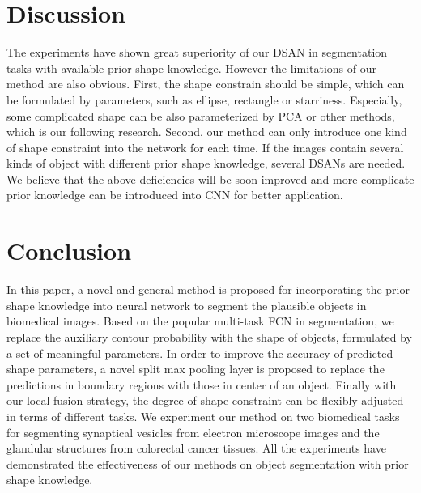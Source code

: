 \documentclass[10pt,twocolumn,letterpaper]{article}
\begin{document}





\section{Discussion}
The experiments have shown great superiority of our DSAN in segmentation tasks with available prior shape knowledge.
However the limitations of our method are also obvious.
First, the shape constrain should be simple, which can be formulated by parameters, such as ellipse, rectangle or starriness.
Especially, some complicated shape can be also parameterized by PCA or other methods, which is our following research.
Second, our method can only introduce one kind of shape constraint into the network for each time.
If the images contain several kinds of object with different prior shape knowledge, several DSANs are needed.
We believe that the above deficiencies will be soon improved and more complicate prior knowledge can be introduced into CNN for better application.

\section{Conclusion}
In this paper, a novel and general method is proposed for incorporating the prior shape knowledge into neural network to segment the plausible objects in biomedical images.
Based on the popular multi-task FCN in segmentation, we replace the auxiliary contour probability with the shape of objects, formulated by a set of meaningful parameters.
In order to improve the accuracy of predicted shape parameters, a novel split max pooling layer is proposed to replace the predictions in boundary regions with those in center of an object.
Finally with our local fusion strategy, the degree of shape constraint can be flexibly adjusted in terms of different tasks.
We experiment our method on two biomedical tasks for segmenting synaptical vesicles from electron microscope images and the glandular structures from colorectal cancer tissues.
All the experiments have demonstrated the effectiveness of our methods on object segmentation with prior shape knowledge.

{\small


}
\end{document}
